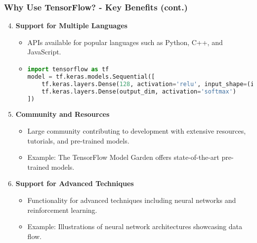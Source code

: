 \documentclass[aspectratio=169]{beamer}
\begin{document}
\begin{frame}[fragile]
    \frametitle{Why Use TensorFlow? - Key Benefits (cont.)}
    \begin{enumerate}
        \setcounter{enumi}{3} %
        \item \textbf{Support for Multiple Languages}
        \begin{itemize}
            \item APIs available for popular languages such as Python, C++, and JavaScript.
            \item \begin{lstlisting}[language=Python]
import tensorflow as tf
model = tf.keras.models.Sequential([
    tf.keras.layers.Dense(128, activation='relu', input_shape=(input_dim,)),
    tf.keras.layers.Dense(output_dim, activation='softmax')
])
            \end{lstlisting}
        \end{itemize}

        \item \textbf{Community and Resources}
        \begin{itemize}
            \item Large community contributing to development with extensive resources, tutorials, and pre-trained models.
            \item Example: The TensorFlow Model Garden offers state-of-the-art pre-trained models.
        \end{itemize}

        \item \textbf{Support for Advanced Techniques}
        \begin{itemize}
            \item Functionality for advanced techniques including neural networks and reinforcement learning.
            \item Example: Illustrations of neural network architectures showcasing data flow.
        \end{itemize}
    \end{enumerate}
\end{frame}
\end{document}
